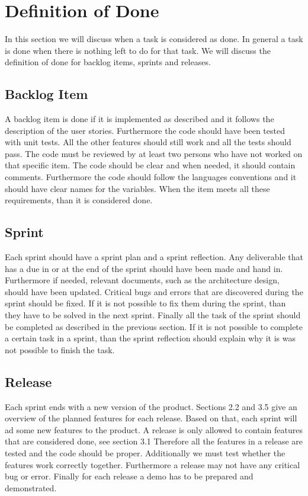 \section{Definition of Done}
In this section we will discuss when a task is considered as done. In general a task is done when there is nothing left to do for that task. We will discuss the definition of done for backlog items, sprints and releases.

\subsection{Backlog Item}
A backlog item is done if it is implemented as described and it follows the description of the user stories. Furthermore the code should have been tested with unit tests. All the other features should still work and all the tests should pass. The code must be reviewed by at least two persons who have not worked on that specific item. The code should be clear and when needed, it should contain comments. Furthermore the code should follow the languages conventions and it should have clear names for the variables. When the item meets all these requirements, than it is considered done.

\subsection{Sprint}
Each sprint should have a sprint plan and a sprint reflection. Any deliverable that has a due in or at the end of the sprint should have been made and hand in. Furthermore  if needed, relevant documents, such as the architecture design, should have been updated. Critical bugs and errors that are discovered during the sprint should be fixed. If it is not possible to fix them during the sprint, than they have to be solved in the next sprint. Finally all the task of the sprint should be completed as described in the previous section. If it is not possible to complete a certain task in a sprint, than the sprint reflection should explain why it is was not possible to finish the task.

\subsection{Release}
Each sprint ends with a new version of the product. Sections 2.2 and 3.5 give an overview of the planned features for each release. Based on that, each sprint will ad some new features to the product.
A release is only allowed to contain features that are considered done, see section 3.1 Therefore all the features in a release are tested and the code should be proper. Additionally we must test whether the features work correctly together. Furthermore a release may not have any critical bug or error. Finally for each release a demo has to be prepared and demonstrated. 